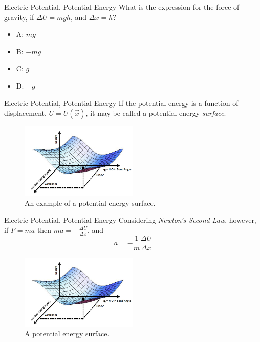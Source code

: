 \documentclass{beamer}
\begin{document}
\begin{frame}{Electric Potential, Potential Energy}
What is the expression for the force of gravity, if $\Delta U = mgh$, and $\Delta x = h$?
\begin{itemize}
\item A: $mg$
\item B: $-mg$
\item C: $g$
\item D: $-g$
\end{itemize}
\end{frame}

\begin{frame}{Electric Potential, Potential Energy}
\small
If the potential energy is a function of displacement, $U = U(\vec{x})$, it may be called a potential energy \textit{surface}.
\begin{figure}
\centering
\includegraphics[width=0.5\textwidth]{figures/potential.png}
\caption{\label{fig:potential} An example of a potential energy surface.}
\end{figure}
\end{frame}

\begin{frame}{Electric Potential, Potential Energy}
\small
Considering \textit{Newton's Second Law}, however, if $F = m a$ then $m a = -\frac{\Delta U}{\Delta x}$, and
\begin{equation}
a = -\frac{1}{m}\frac{\Delta U}{\Delta x}
\end{equation}
\begin{figure}
\centering
\includegraphics[width=0.5\textwidth]{figures/potential.png}
\caption{\label{fig:potential2} \small A potential energy surface.}
\end{figure}
\end{frame}
\end{document}

